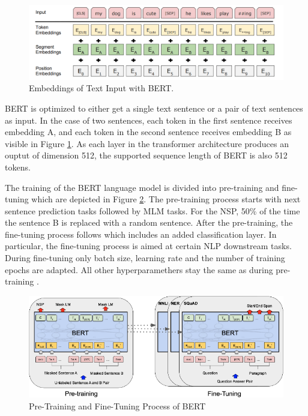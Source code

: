 \begin{figure}[H]
	\centering
	\includegraphics[width=1\textwidth]{figures/bert_tokenizing.png}
	\caption{Embeddings of Text Input with BERT.}
	\label{fig:bert_tokenizing}
\end{figure}

BERT is optimized to either get a single text sentence or a pair of text sentences as input. In the case of two sentences, each token in the first sentence receives embedding A, and each token in the second sentence receives embedding B as visible in Figure \ref{fig:bert_tokenizing}. As each layer in the transformer architecture produces an ouptut of dimension 512, the supported sequence length of BERT is also 512 tokens. \newline

The training of the BERT language model is divided into pre-training and fine-tuning which are depicted in Figure \ref{fig:bert_training}. The pre-training process starts with next sentence prediction tasks followed by MLM tasks. For the NSP, 50\% of the time the sentence B is replaced with a random sentence. After the pre-training, the fine-tuning process follows which includes an added classification layer. In particular, the fine-tuning process is aimed at certain NLP downstream tasks. During fine-tuning only batch size, learning rate and the number of training epochs are adapted. All other hyperparamethers stay the same as during pre-training \cite{Devlin}.

\begin{figure}[H]
	\centering
	\includegraphics[width=1\textwidth]{figures/bert_training.png}
	\caption{Pre-Training and Fine-Tuning Process of BERT}
	\label{fig:bert_training}
\end{figure}




